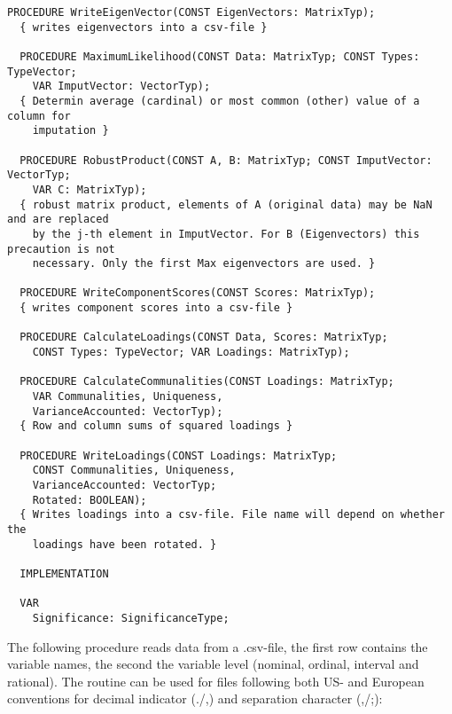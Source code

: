 \begin{lstlisting}[caption=Interface of unit PCA]
  PROCEDURE WriteEigenVector(CONST EigenVectors: MatrixTyp);
  { writes eigenvectors into a csv-file }

  PROCEDURE MaximumLikelihood(CONST Data: MatrixTyp; CONST Types: TypeVector;
    VAR ImputVector: VectorTyp);
  { Determin average (cardinal) or most common (other) value of a column for
    imputation }

  PROCEDURE RobustProduct(CONST A, B: MatrixTyp; CONST ImputVector: VectorTyp;
    VAR C: MatrixTyp);
  { robust matrix product, elements of A (original data) may be NaN and are replaced
    by the j-th element in ImputVector. For B (Eigenvectors) this precaution is not
    necessary. Only the first Max eigenvectors are used. }

  PROCEDURE WriteComponentScores(CONST Scores: MatrixTyp);
  { writes component scores into a csv-file }

  PROCEDURE CalculateLoadings(CONST Data, Scores: MatrixTyp;
    CONST Types: TypeVector; VAR Loadings: MatrixTyp);

  PROCEDURE CalculateCommunalities(CONST Loadings: MatrixTyp;
    VAR Communalities, Uniqueness,
    VarianceAccounted: VectorTyp);
  { Row and column sums of squared loadings }

  PROCEDURE WriteLoadings(CONST Loadings: MatrixTyp;
    CONST Communalities, Uniqueness,
    VarianceAccounted: VectorTyp;
    Rotated: BOOLEAN);
  { Writes loadings into a csv-file. File name will depend on whether the
    loadings have been rotated. }

  IMPLEMENTATION

  VAR
    Significance: SignificanceType;
\end{lstlisting}

The following procedure reads data from a .csv-file, the first row contains the variable names, the second the variable level (nominal, ordinal, interval and rational). The routine can be used for files following both US- and European conventions for decimal indicator (./,) and separation character (,/;):

